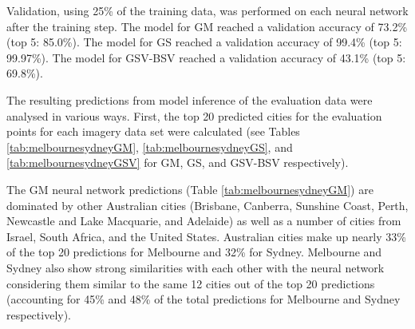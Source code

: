 \documentclass[10pt,letterpaper]{article}
\begin{document}
Validation, using 25\% of the training data, was performed on each neural network after the training step. The model for GM reached a validation accuracy of 73.2\% (top 5: 85.0\%). The model for GS reached a validation accuracy of 99.4\% (top 5: 99.97\%). The model for GSV-BSV reached a validation accuracy of 43.1\% (top 5: 69.8\%).

The resulting predictions from model inference of the evaluation data were analysed in various ways. First, the top 20 predicted cities for the evaluation points for each imagery data set were calculated (see Tables \ref{tab:melbournesydneyGM}, \ref{tab:melbournesydneyGS}, and \ref{tab:melbournesydneyGSV} for GM, GS, and GSV-BSV respectively).



The GM neural network predictions (Table \ref{tab:melbournesydneyGM}) are dominated by other Australian cities (Brisbane, Canberra, Sunshine Coast, Perth, Newcastle and Lake Macquarie, and Adelaide) as well as a number of cities from Israel, South Africa, and the United States. Australian cities make up nearly 33\% of the top 20 predictions for Melbourne and 32\% for Sydney. Melbourne and Sydney also show strong similarities with each other with the neural network considering them similar to the same 12 cities out of the top 20 predictions (accounting for 45\% and 48\% of the total predictions for Melbourne and Sydney respectively).
\end{document}
